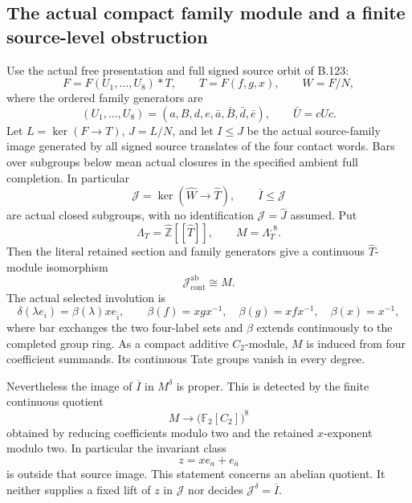 \subsection*{The actual compact family module and a finite source-level obstruction}

\label{stmt:B128}
Use the actual free presentation and full signed source orbit of B.123:
\[
 F=F(U_1,\ldots,U_8)*T,\qquad T=F(f,g,x),\qquad W=F/N,
\]
where the ordered family generators are
\[
 (U_1,\ldots,U_8)=(a,B,d,e,\bar a,\bar B,\bar d,\bar e),
 \qquad \bar U=cUc.
\]
Let $L=\ker(F\to T)$, $J=L/N$, and let $I\leq J$ be the
actual source-family image generated by all signed source translates
of the four contact words. Bars over subgroups below mean actual
closures in the specified ambient full completion. In particular
\[
 \mathcal J=\ker(\widehat W\to\widehat T),\qquad
 \overline I\leq\mathcal J
\]
are actual closed subgroups, with no identification
$\mathcal J=\widehat J$ assumed. Put
\[
 \Lambda_T=\widehat{\mathbb Z}[[\widehat T]],
 \qquad M=\Lambda_T^{,8}.
\]
Then the literal retained section and family generators give a
continuous $\widehat T$-module isomorphism
\begin{equation}\label{eq:B128-actual-module}
 \mathcal J^{\mathrm{ab}}_{\mathrm{cont}}\cong M.
\end{equation}
The actual selected involution is
\begin{equation}\label{eq:B128-module-involution}
 \delta(\lambda e_i)=\beta(\lambda)x e_{\bar i},\qquad
 \beta(f)=xgx^{-1},\quad\beta(g)=xfx^{-1},\quad\beta(x)=x^{-1},
\end{equation}
where bar exchanges the two four-label sets and $\beta$ extends
continuously to the completed group ring. As a compact additive
$C_2$-module, $M$ is induced from four coefficient summands.
Its continuous Tate groups vanish in every degree.

Nevertheless the image of $\overline I$ in $M^\delta$ is proper.
This is detected by the finite continuous quotient
\begin{equation}\label{eq:B128-finite-detector}
 M\longrightarrow\bigl(\mathbb F_2[C_2]\bigr)^8
\end{equation}
obtained by reducing coefficients modulo two and the retained
$x$-exponent modulo two. In particular the invariant class
\begin{equation}\label{eq:B128-missing-class}
 z=x e_a+e_{\bar a}
\end{equation}
is outside that source image. This statement concerns an abelian
quotient. It neither supplies a fixed lift of $z$ in $\mathcal J$
nor decides $\mathcal J^\delta=\overline I$.

